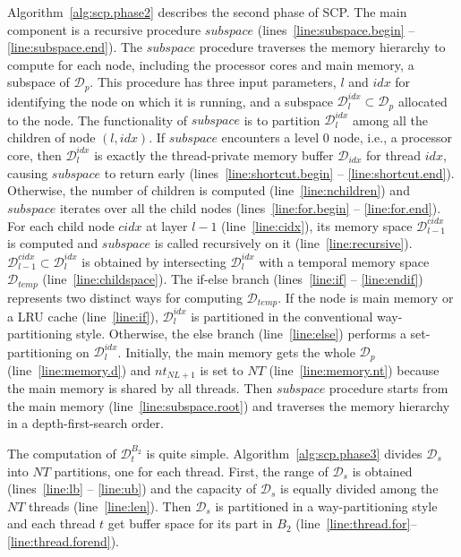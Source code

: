 Algorithm~\ref{alg:scp.phase2} describes
the second phase of SCP.
The main component is a recursive procedure $subspace$
(lines~\ref{line:subspace.begin} -- \ref{line:subspace.end}).
The $subspace$ procedure traverses the memory hierarchy
to compute for each node, including the processor cores and main memory,
a subspace of $\mathcal{D}_p$.
This procedure
has three input parameters, $l$ and $idx$ for
identifying the node on which it is running,
and a subspace $\mathcal{D}_l^{idx} \subset \mathcal{D}_p$ allocated to the node. 
The functionality of $subspace$ is to partition $\mathcal{D}_l^{idx}$
among all the children of node $(l, idx)$.
If $subspace$ encounters a level 0 node, i.e.,
a processor core,
then $\mathcal{D}_l^{idx}$ is exactly the thread-private
memory buffer $\mathcal{D}_{idx}$ for thread $idx$,
causing $subspace$ to return early
(lines~\ref{line:shortcut.begin} -- \ref{line:shortcut.end}).
Otherwise, the number of children is computed (line~\ref{line:nchildren})
and $subspace$ iterates over all the child nodes
(lines~\ref{line:for.begin} -- \ref{line:for.end}).
For each child node $cidx$ at layer $l-1$ (line~\ref{line:cidx}),
its memory space $\mathcal{D}_{l-1}^{cidx}$ is computed
and $subspace$ is called recursively on it (line~\ref{line:recursive}).
$\mathcal{D}_{l-1}^{cidx} \subset \mathcal{D}_l^{idx}$ is obtained
by intersecting $\mathcal{D}_l^{idx}$ with
a temporal memory space $\mathcal{D}_{temp}$ (line~\ref{line:childspace}).
The if-else branch (lines~\ref{line:if} -- \ref{line:endif})
represents two distinct ways for computing
$\mathcal{D}_{temp}$.
If the node is main memory or a LRU cache (line~\ref{line:if}),
$\mathcal{D}_l^{idx}$ is partitioned in the conventional
way-partitioning style.
Otherwise, the else branch (line~\ref{line:else}) performs
a set-partitioning on $\mathcal{D}_l^{idx}$.
Initially, the main memory gets the whole $\mathcal{D}_p$ (line~\ref{line:memory.d})
and $nt_{NL+1}$ is set to $NT$ (line~\ref{line:memory.nt})
because the main memory is shared by all threads.
Then $subspace$ procedure starts from the main memory (line~\ref{line:subspace.root})
and traverses the memory hierarchy in a depth-first-search order.

The computation of $\mathcal{D}_t^{B_2}$ is quite simple.
Algorithm~\ref{alg:scp.phase3} divides $\mathcal{D}_s$
into $NT$ partitions, one for each thread.
First, the range of $\mathcal{D}_s$ is obtained
(lines~\ref{line:lb} -- \ref{line:ub}) and
the capacity of $\mathcal{D}_s$ is equally
divided among the $NT$ threads (line~\ref{line:len}).
Then $\mathcal{D}_s$ is partitioned in a way-partitioning style
and each thread $t$ get buffer space for its part in $B_2$
(line~\ref{line:thread.for}--\ref{line:thread.forend}).

